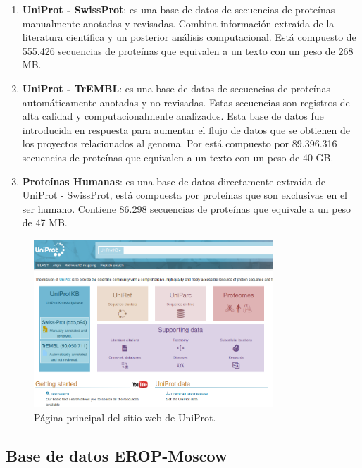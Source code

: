 \begin{enumerate}

\item \textbf{UniProt - SwissProt}: es una base de datos de secuencias de proteínas manualmente anotadas y revisadas. Combina información extraída de la literatura científica y un posterior análisis computacional. Está compuesto de 555.426 secuencias de proteínas que equivalen a un texto con un peso de 268 MB.

\item \textbf{UniProt - TrEMBL}: es una base de datos de secuencias de proteínas automáticamente anotadas y no revisadas. Estas secuencias son registros de alta calidad y computacionalmente analizados. Esta base de datos fue introducida en respuesta para aumentar el flujo de datos que se obtienen de los proyectos relacionados al genoma. Por está compuesto por 89.396.316 secuencias de proteínas que equivalen a un texto con un peso de 40 GB.

\item \textbf{Proteínas Humanas}: es una base de datos directamente extraída de UniProt - SwissProt, está compuesta por proteínas que son exclusivas en el ser humano. Contiene 86.298 secuencias de proteínas que equivale a un peso de 47 MB.

\end{enumerate}

\begin{figure}[!htb]
    \centering
    \includegraphics[width=0.8\textwidth]{./images/uniprot_main.png}
    \caption{Página principal del sitio web de UniProt.}
    \label{fig:image7}
\end{figure}

\subsection{Base de datos EROP-Moscow}

